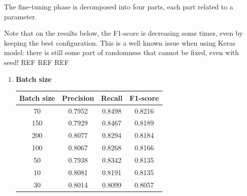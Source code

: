 The fine-tuning phase is decomposed into four parts, each part related to a parameter.

Note that on the results below, the F1-score is decreasing some times, even by keeping the best configuration. This is a well known issue when using Keras model: there is still some part of randomness that cannot be fixed, even with seed! REF REF REF


\begin{enumerate}

    \item \textbf{Batch size} \\
        \vspace{-1cm}
        \begin{table}[htbp]
            \centering
            \begin{tabular}{c|c|c|c}
            \textbf{Batch size} & \textbf{Precision} & \textbf{Recall} & \textbf{F1-score} \\ \hline
                70      &	0.7952    &	0.8498    &	0.8216 \\
                150     &	0.7929    &	0.8467    &	0.8189 \\
                200     &	0.8077    &	0.8294    &	0.8184 \\
                100     &	0.8067    &	0.8268    &	0.8166 \\
                50      &	0.7938    &	0.8342    &	0.8135 \\
                10      &	0.8081    &	0.8191    &	0.8135 \\
                30      &	0.8014    &	0.8099    &	0.8057 \\
            \end{tabular}
        \end{table}        
    



\end{enumerate}
